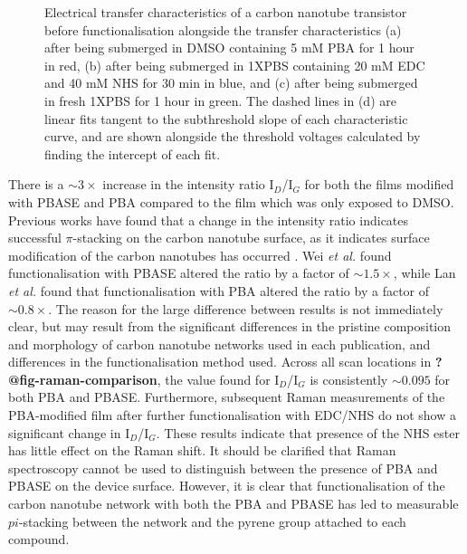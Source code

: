 \documentclass[
  a4paper,
]{scrbook}
\begin{document}
\begin{figure}
\begin{minipage}[t]{0.50\linewidth}
{{}

}

\subcaption{\label{fig-pba-threshold-shift-comparison}}
\end{minipage}%

\caption{\label{fig-pba-functionalisation-threshold-shift}Electrical
transfer characteristics of a carbon nanotube transistor before
functionalisation alongside the transfer characteristics (a) after being
submerged in DMSO containing 5 mM PBA for 1 hour in red, (b) after being
submerged in 1XPBS containing 20 mM EDC and 40 mM NHS for 30 min in
blue, and (c) after being submerged in fresh 1XPBS for 1 hour in green.
The dashed lines in (d) are linear fits tangent to the subthreshold
slope of each characteristic curve, and are shown alongside the
threshold voltages calculated by finding the intercept of each fit.}

\end{figure}

There is a \(\sim 3 \times\) increase in the intensity ratio
I\(_D\)/I\(_G\) for both the films modified with PBASE and PBA compared
to the film which was only exposed to DMSO. Previous works have found
that a change in the intensity ratio indicates successful
\(\pi\)-stacking on the carbon nanotube surface, as it indicates surface
modification of the carbon nanotubes has occurred
\autocite{Wei2010,Lan2013}. Wei \emph{et al.} \autocite{Wei2010} found
functionalisation with PBASE altered the ratio by a factor of
\(\sim 1.5 \times\), while Lan \emph{et al.} \autocite{Lan2013} found
that functionalisation with PBA altered the ratio by a factor of
\(\sim 0.8 \times\). The reason for the large difference between results
is not immediately clear, but may result from the significant
differences in the pristine composition and morphology of carbon
nanotube networks used in each publication, and differences in the
functionalisation method used. Across all scan locations in
\textbf{?@fig-raman-comparison}, the value found for I\(_D\)/I\(_G\) is
consistently \(\sim 0.095\) for both PBA and PBASE. Furthermore,
subsequent Raman measurements of the PBA-modified film after further
functionalisation with EDC/NHS do not show a significant change in
I\(_D\)/I\(_G\). These results indicate that presence of the NHS ester
has little effect on the Raman shift. It should be clarified that Raman
spectroscopy cannot be used to distinguish between the presence of PBA
and PBASE on the device surface. However, it is clear that
functionalisation of the carbon nanotube network with both the PBA and
PBASE has led to measurable \(pi\)-stacking between the network and the
pyrene group attached to each compound.
\end{document}
